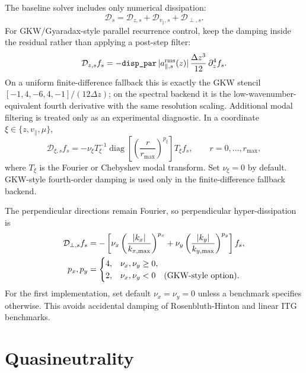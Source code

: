 \documentclass[11pt,a4paper]{article}
\newcommand{\vpar}{v_{\parallel}}
\newcommand{\Dop}{\mathcal{D}}
\DeclareMathOperator{\diag}{diag}
\begin{document}
The baseline solver includes only numerical dissipation:
\begin{equation}
  \Dop_s
  =
  \Dop_{z,s}
  +\Dop_{v_\parallel,s}
  +\Dop_{\perp,s}.
  \label{eq:diss-total}
\end{equation}
For GKW/Gyaradax-style parallel recurrence control, keep the damping inside the
residual rather than applying a post-step filter:
\begin{equation}
  \Dop_{z,s} f_s
  =
  -\texttt{disp\_par}\,
  |a_{\parallel,s}^{\rm rms}(z)|\,
  \frac{\Delta z^3}{12}\,
  \partial_z^4 f_s .
  \label{eq:gkw-disp-par}
\end{equation}
On a uniform finite-difference fallback this is exactly the GKW stencil
\([ -1,4,-6,4,-1]/(12\Delta z)\); on the spectral backend it is the
low-wavenumber-equivalent fourth derivative with the same resolution scaling.
Additional modal filtering is treated only as an experimental diagnostic.  In a
coordinate \(\xi\in\{z,\vpar,\mu\}\),
\begin{equation}
  \Dop_{\xi,s} f_s
  =
  -\nu_\xi
  T_\xi^{-1}
  \diag\left[
    \left(\frac{r}{r_{\max}}\right)^{p_\xi}
  \right]
  T_\xi f_s,
  \qquad
  r=0,\ldots,r_{\max},
  \label{eq:spectral-diss}
\end{equation}
where \(T_\xi\) is the Fourier or Chebyshev modal transform.  Set
\(\nu_\xi=0\) by default.  GKW-style fourth-order damping is used only in the
finite-difference fallback backend.

The perpendicular directions remain Fourier, so perpendicular hyper-dissipation is
\begin{align}
  \Dop_{\perp,s} f_s
  &=
  -\left[
    \nu_x\left(\frac{|k_x|}{k_{x,\max}}\right)^{p_x}
    +
    \nu_y\left(\frac{|k_y|}{k_{y,\max}}\right)^{p_y}
  \right]f_s,
  \label{eq:perp-diss}
  \\
  p_x,p_y&=
  \begin{cases}
    4, & \nu_x,\nu_y \ge 0,\\
    2, & \nu_x,\nu_y < 0\quad \hbox{(GKW-style option).}
  \end{cases}
\end{align}
For the first implementation, set default \(\nu_x=\nu_y=0\) unless a benchmark specifies otherwise.  This avoids accidental damping of Rosenbluth-Hinton and linear ITG benchmarks.

\section{Quasineutrality}
\end{document}
